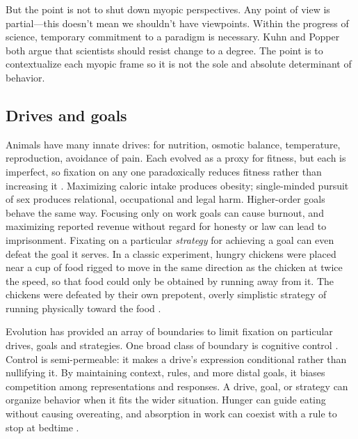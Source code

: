 \documentclass[11pt]{article}
\begin{document}
But the point is not to shut down myopic perspectives. Any point of view is partial---this doesn't mean we shouldn't have viewpoints. Within the progress of science, temporary commitment to a paradigm is necessary. Kuhn and Popper \citep{popper1975rationality} both argue that scientists should resist change to a degree.  The point is to contextualize each myopic frame so it is not the sole and absolute determinant of behavior. 



\subsection{Drives and goals} 

Animals have many innate drives: for nutrition, osmotic balance, temperature, reproduction, avoidance of pain. Each evolved as a proxy for fitness, but each is imperfect, so fixation on any one paradoxically reduces fitness rather than increasing it \citep{kurthnelson2024dynamic, john2023dead, mcfarland1975behavioural}. Maximizing caloric intake produces obesity; single-minded pursuit of sex produces relational, occupational and legal harm. Higher-order goals behave the same way. Focusing only on work goals can cause burnout, and maximizing reported revenue without regard for honesty or law can lead to imprisonment. Fixating on a particular \textit{strategy} for achieving a goal can even defeat the goal it serves. In a classic experiment, hungry chickens were placed near a cup of food rigged to move in the same direction as the chicken at twice the speed, so that food could only be obtained by running away from it. The chickens were defeated by their own prepotent, overly simplistic strategy of running physically toward the food \citep{hershberger1986approach, dayan2006misbehavior}.

Evolution has provided an array of boundaries to limit fixation on particular drives, goals and strategies. One broad class of boundary is cognitive control \citep{botvinick2001conflict, diamond2013executive}. Control is semi-permeable: it makes a drive's expression conditional rather than nullifying it. By maintaining context, rules, and more distal goals, it biases competition among representations and responses. A drive, goal, or strategy can organize behavior when it fits the wider situation. Hunger can guide eating without causing overeating, and absorption in work can coexist with a rule to stop at bedtime \citep{miller2001integrative,braver2012variable}.
\end{document}
